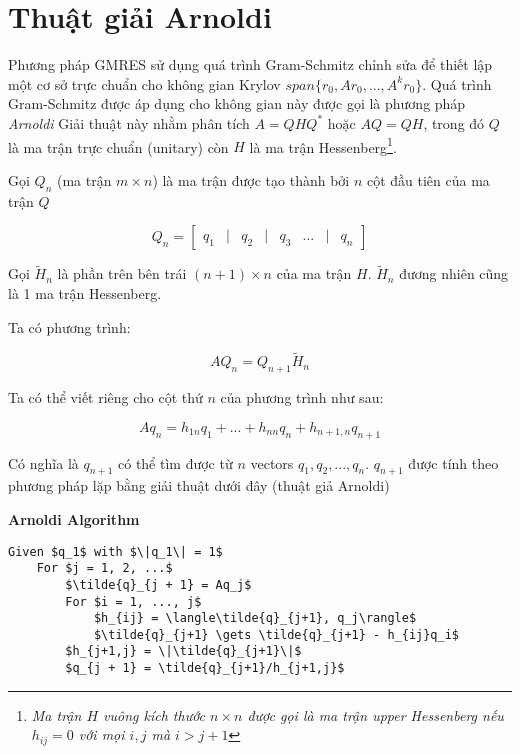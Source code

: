 \section{Thuật giải Arnoldi}
Phương pháp GMRES sử dụng quá trình Gram-Schmitz chỉnh sửa để thiết lập
một cơ sở trực chuẩn cho không gian Krylov $span\{r_0, Ar_0, ..., A^kr_0 \}$.
Quá trình Gram-Schmitz được áp dụng cho không gian này được gọi là phương pháp \textit{Arnoldi}
Giải thuật này nhằm phân tích $A=QHQ^*$ hoặc $AQ = QH$, trong đó $Q$ là ma trận trực chuẩn (unitary) 
còn $H$ là ma trận Hessenberg\footnote{
    \textit{
    Ma trận $H$ vuông kích thước $n \times n$ được gọi là ma trận upper Hessenberg nếu
    $h_{ij} = 0$ với mọi $i,j$ mà $i > j + 1$
}
}.

Gọi $Q_n$ (ma trận $m \times n$) là ma trận được tạo thành bởi $n$ cột đầu tiên của ma trận $Q$

\begin{equation}
    Q_n = \begin{bmatrix}
        q_1 & | & q_2 & | & q_3 & ... & | & q_n
    \end{bmatrix}    
\end{equation}

Gọi $\tilde{H}_n$ là phần trên bên trái $(n + 1) \times n$ của ma trận $H$.
$\tilde{H}_n$ đương nhiên cũng là 1 ma trận Hessenberg. 

Ta có phương trình:

\begin{equation}
    AQ_n = Q_{n + 1}\tilde{H}_n \label{arnoldi:1}
\end{equation}

Ta có thể viết riêng cho cột thứ $n$ của phương trình như sau:

\begin{equation}
    Aq_n = h_{1n}q_1 + ... + h_{nn}q_n + h_{n+1,n}q_{n + 1}
\end{equation}

Có nghĩa là $q_{n+1}$ có thể tìm được từ $n$ vectors $q_1, q_2, ..., q_n$. 
$q_{n+1}$ được tính theo phương pháp lặp bằng giải thuật dưới đây (thuật giả Arnoldi)


\textbf{Arnoldi Algorithm}
\begin{lstlisting}[style=algo]
    Given $q_1$ with $\|q_1\| = 1$
    For $j = 1, 2, ...$
        $\tilde{q}_{j + 1} = Aq_j$
        For $i = 1, ..., j$
            $h_{ij} = \langle\tilde{q}_{j+1}, q_j\rangle$
            $\tilde{q}_{j+1} \gets \tilde{q}_{j+1} - h_{ij}q_i$
        $h_{j+1,j} = \|\tilde{q}_{j+1}\|$
        $q_{j + 1} = \tilde{q}_{j+1}/h_{j+1,j}$
\end{lstlisting}

